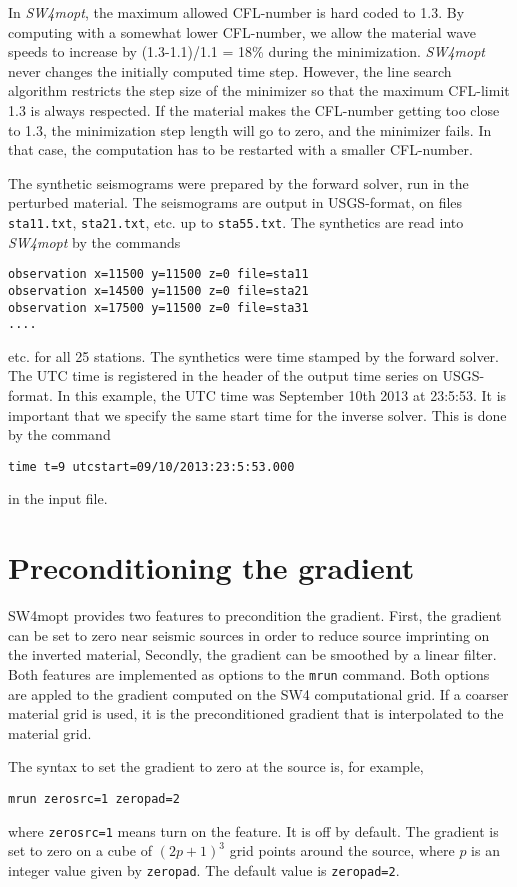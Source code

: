\documentclass[12pt]{report}
\begin{document}
In \emph{SW4mopt}, the maximum allowed CFL-number is hard coded to 1.3. By computing with a somewhat lower 
CFL-number, we allow the material wave speeds to increase by (1.3-1.1)/1.1 = 18\% during the minimization. 
\emph{SW4mopt} never changes the initially computed time step. However, the line search algorithm restricts
the step size of the minimizer so that the maximum CFL-limit 1.3 is always respected. 
If the material makes the CFL-number getting too close to 1.3, the minimization step length will go 
to zero, and the minimizer fails. In that case, the computation has to be restarted with a 
smaller CFL-number. 
\par
The synthetic seismograms were prepared by the forward solver, run in the perturbed material. The
seismograms are output in USGS-format, on files \verb+sta11.txt+, \verb+sta21.txt+, etc. up
to \verb+sta55.txt+. The synthetics are read into \emph{SW4mopt} by the commands
\begin{verbatim}
observation x=11500 y=11500 z=0 file=sta11
observation x=14500 y=11500 z=0 file=sta21
observation x=17500 y=11500 z=0 file=sta31
....
\end{verbatim}
etc. for all 25 stations. The synthetics were time stamped by the forward solver. The UTC time is
registered in the header of the output time series on USGS-format. In this example, the UTC time
was September 10th 2013 at 23:5:53. It is important that we specify the same start time for the 
inverse solver. This is done by the command
\begin{verbatim}
time t=9 utcstart=09/10/2013:23:5:53.000
\end{verbatim}
in the input file.

\section{Preconditioning the gradient}

SW4mopt provides two features to precondition the gradient. First, the gradient can be 
set to zero near seismic sources in order to reduce source imprinting on the inverted material,
Secondly, the gradient can be smoothed by a linear filter. Both features are implemented
as options to the {\tt mrun} command. Both options are appled to the gradient computed
on the SW4 computational grid. If a coarser material grid is used, it is the preconditioned
gradient that is interpolated to the material grid.

The syntax to set the gradient to zero at the source is, for example,
\begin{verbatim}
mrun zerosrc=1 zeropad=2
\end{verbatim}
where {\tt zerosrc=1} means turn on the feature. It is off by default. The gradient is
set to zero on a cube of $(2p+1)^3$ grid points around the source,
where $p$ is an integer value given by {\tt zeropad}. The default value is {\tt zeropad=2}.
\end{document}
